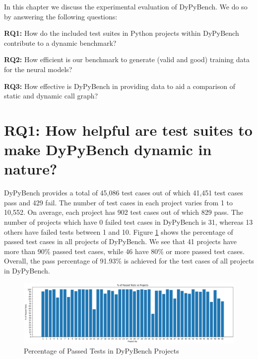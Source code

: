 In this chapter we discuss the experimental evaluation of DyPyBench. We do so by answering the following questions:

\textbf{RQ1:} How do the included test suites in Python projects within DyPyBench contribute to a dynamic benchmark?

\textbf{RQ2:} How efficient is our benchmark to generate (valid and good) training data for the neural models?

\textbf{RQ3:} How effective is DyPyBench in providing data to aid a comparison of static and dynamic call graph?

\section{RQ1: How helpful are test suites to make DyPyBench dynamic in nature?}

DyPyBench provides a total of 45,086 test cases out of which 41,451 test cases pass and 429 fail.   
The number of test cases in each project varies from 1 to 10,552.
On average, each project has 902 test cases out of which 829 pass.  
The number of projects which have 0 failed test cases in DyPyBench is 31, whereas 13 others have failed tests between 1 and 10.
Figure \ref{fig:successful_tests} shows the percentage of passed test cases in all projects of DyPyBench.
We see that 41 projects have more than 90\% passed test cases, while 46 have 80\% or more passed test cases.
Overall, the pass percentage of 91.93\% is achieved for the test cases of all projects in DyPyBench.

\begin{figure}[ht]
    \centering
    \includegraphics[width=1\linewidth]{figures/evaluation/perc_passed_tests.png}
    \caption[Passed Test Case Percentage ]{\label{fig:successful_tests}Percentage of Passed Tests in DyPyBench Projects}
\end{figure}

